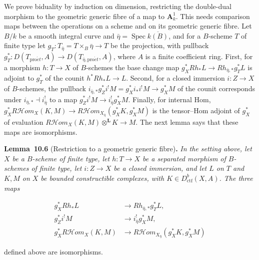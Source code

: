 \documentclass[11pt]{article}
\newenvironment{bpstatement}[2]{\par\addvspace{0.6\baselineskip}\noindent\textbf{#1}#2\textbf{.}\enspace\ignorespaces}
  {\par\addvspace{0.4\baselineskip}}
\newenvironment{bpstatementit}[2]{\begin{bpstatement}{#1}{#2}\itshape\ignorespaces}{\end{bpstatement}}
\providecommand{\cHom}{}\renewcommand{\cHom}{R\mathcal{H}\!om}
\begin{document}
\label{bp118}%
We prove biduality by induction on dimension, restricting the double-dual morphism to the geometric generic fibre of a map to \(\mathbf A^1_k\). This needs comparison maps between the operations on a scheme and on its geometric generic fibre. Let \(B/k\) be a smooth integral curve and \(\bar\eta=\operatorname{Spec}\overline{k(B)}\), and for a \(B\)-scheme \(T\) of finite type let \(g_T:T_{\bar\eta}=T\times_B\bar\eta\to T\) be the projection, with pullback \(g_T^*:D(T_{\mathrm{pro}\acute{e}t},A)\to D(T_{\bar\eta,\mathrm{pro}\acute{e}t},A)\), where \(A\) is a finite coefficient ring. First, for a morphism \(h:T\to X\) of \(B\)-schemes the base change map \(g_X^*Rh_*L\to Rh_{\bar\eta,*}g_T^*L\) is adjoint to \(g_T^*\) of the counit \(h^*Rh_*L\to L\). Second, for a closed immersion \(i:Z\to X\) of \(B\)-schemes, the pullback \(i_{\bar\eta,*}g_Z^*i^!M=g_X^*i_*i^!M\to g_X^*M\) of the counit corresponds under \(i_{\bar\eta,*}\dashv i_{\bar\eta}^!\) to a map \(g_Z^*i^!M\to i_{\bar\eta}^!g_X^*M\). Finally, for internal Hom, \(g_X^*\cHom_X(K,M)\to\cHom_{X_{\bar\eta}}(g_X^*K,g_X^*M)\) is the tensor–Hom adjoint of \(g_X^*\) of evaluation \(\cHom_X(K,M)\otimes^{\mathbf L}K\to M\). The next lemma says that these maps are isomorphisms.

\label{bp119}%
\begin{bpstatementit}{Lemma~10.6}{ (Restriction to a geometric generic fibre)}
In the setting above, let \(X\) be a \(B\)-scheme of finite type, let \(h:T\to X\) be a separated morphism of \(B\)-schemes of finite type, let \(i:Z\to X\) be a closed immersion, and let \(L\) on \(T\) and \(K,M\) on \(X\) be bounded constructible complexes, with \(K\in D^b_{\mathrm{ctf}}(X,A)\). The three maps

\[
\begin{aligned}
g_X^*Rh_*L&\longrightarrow Rh_{\bar\eta,*}g_T^*L,\\
g_Z^*i^!M&\longrightarrow i_{\bar\eta}^!g_X^*M,\\
g_X^*\cHom_X(K,M)&\longrightarrow
\cHom_{X_{\bar\eta}}(g_X^*K,g_X^*M)
\end{aligned}
\]

defined above are isomorphisms.
\end{bpstatementit}
\end{document}

